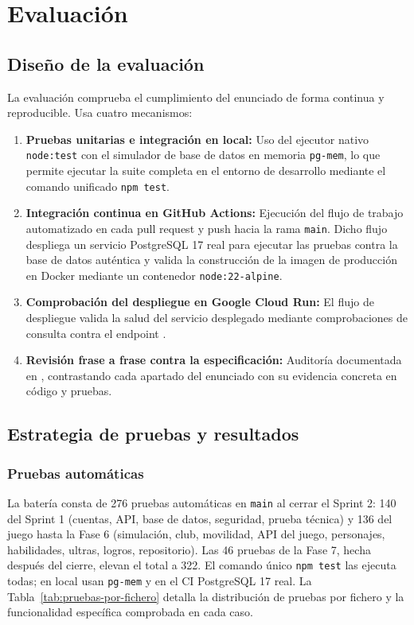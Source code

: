 \chapter{Evaluación}
\label{cap:evaluacion}

\section{Diseño de la evaluación}

La evaluación comprueba el cumplimiento del enunciado de forma continua y reproducible. Usa cuatro mecanismos:
\begin{enumerate}
    \item \textbf{Pruebas unitarias e integración en local:} Uso del ejecutor nativo \texttt{node:test} con el simulador de base de datos en memoria \texttt{pg-mem}, lo que permite ejecutar la suite completa en el entorno de desarrollo mediante el comando unificado \texttt{npm test}.
    \item \textbf{Integración continua en GitHub Actions:} Ejecución del flujo de trabajo automatizado en cada pull request y push hacia la rama \texttt{main}. Dicho flujo despliega un servicio PostgreSQL 17 real para ejecutar las pruebas contra la base de datos auténtica y valida la construcción de la imagen de producción en Docker mediante un contenedor \texttt{node:22-alpine}.
    \item \textbf{Comprobación del despliegue en Google Cloud Run:} El flujo de despliegue valida la salud del servicio desplegado mediante comprobaciones de consulta contra el endpoint .
    \item \textbf{Revisión frase a frase contra la especificación:} Auditoría documentada en , contrastando cada apartado del enunciado con su evidencia concreta en código y pruebas.
\end{enumerate}

\section{Estrategia de pruebas y resultados}

\subsection{Pruebas automáticas}

La batería consta de 276 pruebas automáticas en \texttt{main} al cerrar el Sprint 2: 140 del Sprint 1 (cuentas, API, base de datos, seguridad, prueba técnica) y 136 del juego hasta la Fase 6 (simulación, club, movilidad, API del juego, personajes, habilidades, ultras, logros, repositorio). Las 46 pruebas de la Fase 7, hecha después del cierre, elevan el total a 322. El comando único \texttt{npm test} las ejecuta todas; en local usan \texttt{pg-mem} y en el CI PostgreSQL 17 real. La Tabla~\ref{tab:pruebas-por-fichero} detalla la distribución de pruebas por fichero y la funcionalidad específica comprobada en cada caso.


